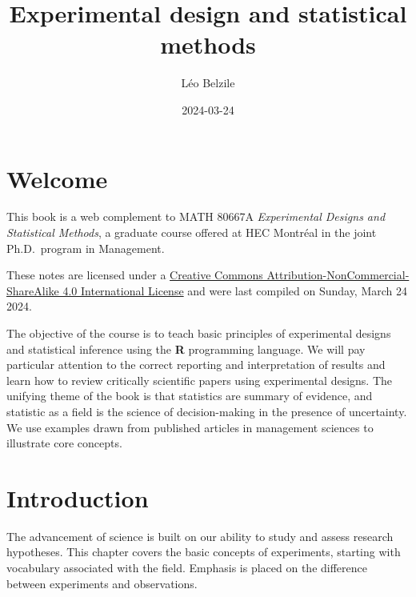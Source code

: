 \documentclass[
  11pt,
  letterpaper,
]{scrbook}
\title{Experimental design and statistical methods}
\author{Léo Belzile}
\date{2024-03-24}
\renewcommand*\contentsname{Table of contents}
\newcommand\contentsname{Table of contents}
\theoremstyle{definition}
\theoremstyle{remark}
\begin{document}


\ifdefined\Shaded\renewenvironment{Shaded}{\begin{tcolorbox}[interior hidden, borderline west={3pt}{0pt}{shadecolor}, enhanced, sharp corners, breakable, frame hidden, boxrule=0pt]}{\end{tcolorbox}}\fi

\renewcommand*\contentsname{Table of contents}
{
\setcounter{tocdepth}{2}
\tableofcontents
}
\mainmatter
{}

\hypertarget{welcome}{%
\chapter*{Welcome}\label{welcome}}


This book is a web complement to MATH 80667A \emph{Experimental Designs
and Statistical Methods}, a graduate course offered at HEC Montréal in
the joint Ph.D.~program in Management.

These notes are licensed under a
\href{http://creativecommons.org/licenses/by-nc-sa/4.0/}{Creative
Commons Attribution-NonCommercial-ShareAlike 4.0 International License}
and were last compiled on Sunday, March 24 2024.

The objective of the course is to teach basic principles of experimental
designs and statistical inference using the \textbf{R} programming
language. We will pay particular attention to the correct reporting and
interpretation of results and learn how to review critically scientific
papers using experimental designs. The unifying theme of the book is
that statistics are summary of evidence, and statistic as a field is the
science of decision-making in the presence of uncertainty. We use
examples drawn from published articles in management sciences to
illustrate core concepts.


\hypertarget{introduction}{%
\chapter{Introduction}\label{introduction}}

The advancement of science is built on our ability to study and assess
research hypotheses. This chapter covers the basic concepts of
experiments, starting with vocabulary associated with the field.
Emphasis is placed on the difference between experiments and
observations.
\end{document}
